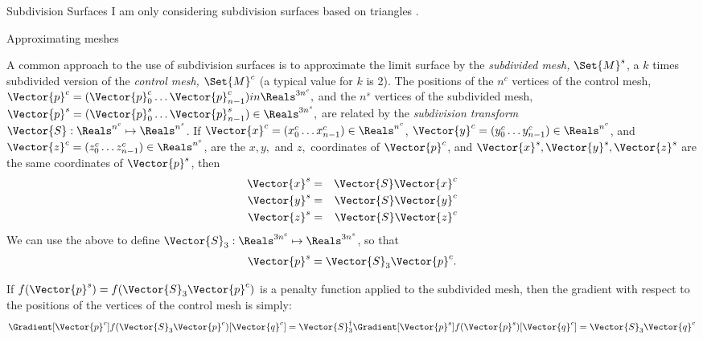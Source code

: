 \begin{plSection}{Subdivision Surfaces}
I am only considering subdivision surfaces based on triangles
\cite{HoppeEtal:1994:SIGGRAPH,Hoppe:1994:Phd}.
\begin{plSection}{Approximating meshes}
\label{sec:Approximating-meshes}

A common approach to the use of subdivision surfaces is
to approximate the limit surface by the {\it subdivided mesh,} 
$\Set{M}^s$,
a $k$ times subdivided version of the {\it control mesh,} 
$\Set{M}^c$
(a typical value for $k$ is 2).
The positions of the $n^c$ vertices of the control mesh,
$\Vector{p}^c = 
(\Vector{p}^c_0 \ldots \Vector{p}^c_{n-1}) \\in \Reals^{3n^c},$
and the $n^s$ vertices of the subdivided mesh,
$\Vector{p}^s = 
(\Vector{p}^s_0 \ldots \Vector{p}^s_{n-1}) \in \Reals^{3n^s},$
are related by the {\it subdivision transform}
$\Vector{S} : \Reals^{n^c} \mapsto \Reals^{n^s}$.
If
$\Vector{x}^c = (x^c_0 \ldots x^c_{n-1}) \in \Reals^{n^c}$,
$\Vector{y}^c = (y^c_0 \ldots y^c_{n-1}) \in \Reals^{n^c}$,
and
$\Vector{z}^c = (z^c_0 \ldots z^c_{n-1}) \in \Reals^{n^c}$,
are the $x, y,$ and $z,$ coordinates of $\Vector{p}^c$,
and $\Vector{x}^s, \Vector{y}^s, \Vector{z}^s$ 
are the same coordinates
of $\Vector{p}^s$, then
\begin{eqnarray}
\Vector{x}^s & = & \Vector{S} \Vector{x}^c
\\
\Vector{y}^s & = & \Vector{S} \Vector{y}^c
\nonumber
\\
\Vector{z}^s & = & \Vector{S} \Vector{z}^c
\nonumber
\end{eqnarray}
We can use the above to define 
$\Vector{S}_3 : \Reals^{3n^c} \mapsto \Reals^{3n^s}$,
so that
\begin{equation}
\Vector{p}^s = \Vector{S}_3 \Vector{p}^c.
\end{equation}


If $f(\Vector{p}^s) = f(\Vector{S}_3 \Vector{p}^c)$ 
is a penalty function applied to the subdivided mesh,
then the gradient with respect to the positions of
the vertices of the control mesh is simply:
\begin{equation}
\Gradient[\Vector{p}^c]
{f(\Vector{S}_3 \Vector{p}^c)}
[\Vector{q}^c]
 = 
 \Vector{S}_3^{\dagger} 
\Gradient[\Vector{p}^s]{f(\Vector{p}^s)}[\Vector{q}^c] 
 = 
\Vector{S}_3 \Vector{q}^c
\end{equation}

\end{plSection}%
\end{plSection}%
